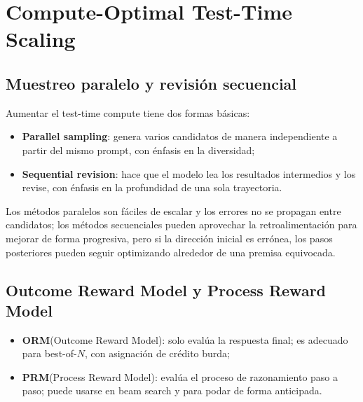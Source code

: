 \section{Compute-Optimal Test-Time Scaling}

\subsection{Muestreo paralelo y revisión secuencial}

Aumentar el test-time compute tiene dos formas básicas:

\begin{itemize}
    \item \textbf{Parallel sampling}: genera varios candidatos de manera independiente a partir del mismo prompt, con énfasis en la diversidad;
    \item \textbf{Sequential revision}: hace que el modelo lea los resultados intermedios y los revise, con énfasis en la profundidad de una sola trayectoria.
\end{itemize}


Los métodos paralelos son fáciles de escalar y los errores no se propagan entre candidatos; los métodos secuenciales pueden aprovechar la retroalimentación para mejorar de forma progresiva, pero si la dirección inicial es errónea, los pasos posteriores pueden seguir optimizando alrededor de una premisa equivocada.

\subsection{Outcome Reward Model y Process Reward Model}


\begin{itemize}
    \item \textbf{ORM}(Outcome Reward Model): solo evalúa la respuesta final; es adecuado para best-of-$N$, con asignación de crédito burda;
    \item \textbf{PRM}(Process Reward Model): evalúa el proceso de razonamiento paso a paso; puede usarse en beam search y para podar de forma anticipada.
\end{itemize}

